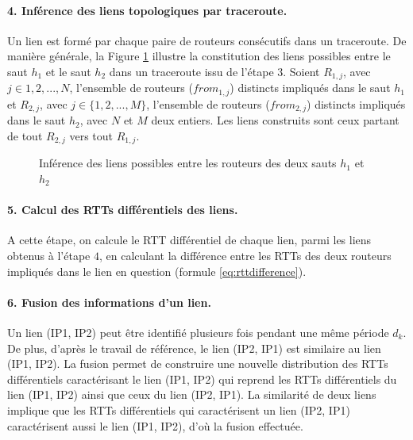 \paragraph{4. Inférence des liens topologiques par traceroute.} Un lien  est formé par chaque paire de routeurs consécutifs dans un traceroute. De manière générale, la Figure \ref{fig:link-inference_} illustre la constitution des liens possibles entre le saut $h_1$ et le saut $h_2$  dans un traceroute issu de l'étape $3$. Soient  $R_{1,j}$, avec $j \in {1,2, ...,N}$,  l'ensemble de routeurs ($from_{1,j}$) distincts impliqués dans le saut $h_1$ et $R_{2,j}$, avec $j \in \{1,2, ..., M\}$, l'ensemble  de routeurs ($from_{2,j}$) distincts impliqués dans le saut $h_2$, avec $ N $ et $ M $ deux entiers. Les liens  construits sont ceux partant de tout $R_{2,j}$ vers tout $R_{1,j}$. 
\begin{figure}[h]
	\centering
	\captionsetup{justification=centering}
	\resizebox{0.4\textwidth}{!}{
		
	}
	\caption{Inférence des liens possibles entre les routeurs des deux sauts $h_{1}$ et $h_{2}$}
	\label{fig:link-inference_}
\end{figure}
\paragraph{5. Calcul des RTTs différentiels des liens.}  A cette étape, on calcule le RTT différentiel de chaque  lien, parmi les liens obtenus à l'étape $4$, en calculant la différence entre les RTTs des deux routeurs impliqués dans le  lien en question (formule \ref{eq:rttdifference}).


\paragraph{6. Fusion des informations d'un lien.} Un lien (IP1, IP2) peut être identifié plusieurs fois pendant une même période $d_k$. De plus, d'après le travail de référence,  le lien (IP2, IP1) est similaire au lien  (IP1, IP2). La fusion permet de construire une nouvelle distribution des RTTs différentiels caractérisant le lien (IP1, IP2) qui reprend les RTTs différentiels du lien (IP1, IP2) ainsi que ceux du lien (IP2, IP1). La similarité de deux liens  implique que les RTTs différentiels qui caractérisent un lien (IP2, IP1) caractérisent aussi le lien (IP1, IP2), d'où la fusion effectuée.


